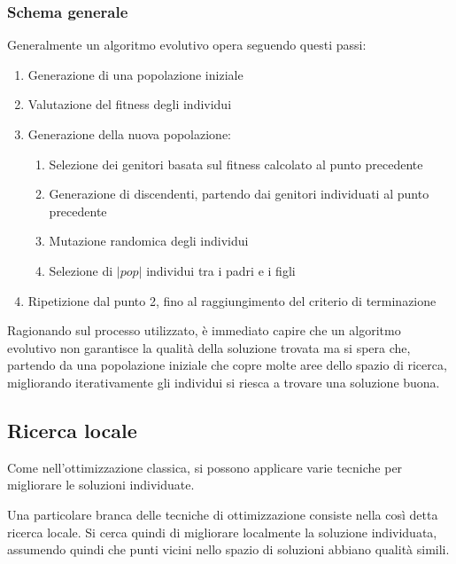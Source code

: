 \documentclass[a4paper]{article}
\begin{document}
\subsubsection{Schema generale}
Generalmente un algoritmo evolutivo opera seguendo questi passi:
\begin{enumerate}
    \item Generazione di una popolazione iniziale
    \item Valutazione del fitness degli individui
    \item Generazione della nuova popolazione:
    \begin{enumerate}
        \item Selezione dei genitori basata sul fitness calcolato al punto precedente
        \item Generazione di discendenti, partendo dai genitori individuati al punto precedente
        \item Mutazione randomica degli individui
        \item Selezione di $|pop|$ individui tra i padri e i figli
    \end{enumerate}
    \item Ripetizione dal punto 2, fino al raggiungimento del criterio di terminazione
\end{enumerate}
Ragionando sul processo utilizzato, è immediato capire che un algoritmo evolutivo non garantisce
la qualità della soluzione trovata ma si spera che, partendo da una popolazione iniziale 
che copre molte aree dello spazio di ricerca, migliorando iterativamente gli individui 
si riesca a trovare una soluzione buona.

\subsection{Ricerca locale}
Come nell'ottimizzazione classica, si possono applicare varie tecniche per 
migliorare le soluzioni individuate.

Una particolare branca delle tecniche di ottimizzazione consiste nella così 
detta ricerca locale. Si cerca quindi di migliorare localmente la soluzione 
individuata, assumendo quindi che punti 
vicini nello spazio di soluzioni abbiano qualità simili.
\end{document}
